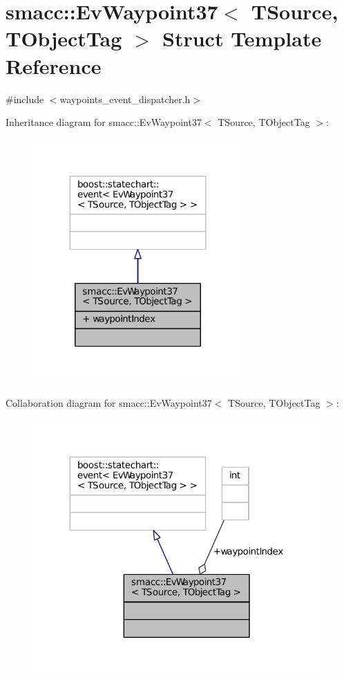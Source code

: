 \hypertarget{structsmacc_1_1EvWaypoint37}{}\section{smacc\+:\+:Ev\+Waypoint37$<$ T\+Source, T\+Object\+Tag $>$ Struct Template Reference}
\label{structsmacc_1_1EvWaypoint37}


{\ttfamily \#include $<$waypoints\+\_\+event\+\_\+dispatcher.\+h$>$}



Inheritance diagram for smacc\+:\+:Ev\+Waypoint37$<$ T\+Source, T\+Object\+Tag $>$\+:
\nopagebreak
\begin{figure}[H]
\begin{center}
\leavevmode
\includegraphics[width=227pt]{structsmacc_1_1EvWaypoint37__inherit__graph}
\end{center}
\end{figure}


Collaboration diagram for smacc\+:\+:Ev\+Waypoint37$<$ T\+Source, T\+Object\+Tag $>$\+:
\nopagebreak
\begin{figure}[H]
\begin{center}
\leavevmode
\includegraphics[width=312pt]{structsmacc_1_1EvWaypoint37__coll__graph}
\end{center}
\end{figure}
